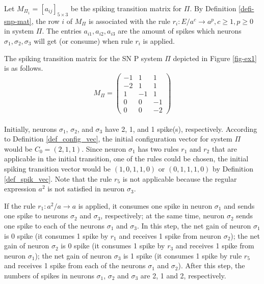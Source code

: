 \documentclass[runningheads]{llncs}
\begin{document}
Let $M_{\Pi_1}=[a_{ij}]_{5 \times 3}$ be the spiking transition
matrix for $\Pi$. By Definition \ref{defi-snp-mat}, the row $i$ of
$M_{\Pi}$ is associated with the rule $r_i: E/a^c\rightarrow a^p,
c\geq 1,p\geq 0$ in system $\Pi$. The entries $a_{i1},a_{i2},a_{i3}$
are the amount of spikes which neurons $\sigma_1,\sigma_2,\sigma_3$
will get (or consume) when rule $r_i$ is applied.


The spiking transition matrix for the SN P system $\Pi$ depicted
 in Figure \ref{fig-ex1} is as follows.\\
[2mm]
\begin{equation}\label{snp_mat}
M_{\Pi} = \left( \begin{array}{ccc}
  -1 & 1 & 1\\
  -2 & 1 &  1 \\
   1 &  -1 & 1 \\
   0 & 0 & -1\\
   0 & 0& -2
  \end{array}\right)
\end{equation}
\\
[0.5mm]


 Initially, neurons $\sigma_1$, $\sigma_2$, and $\sigma_3$ have
  2, 1, and 1 spike(s), respectively. According to Definition \ref{def_config_vec},
  the initial configuration vector
 for system $\Pi$ would be $C_{0} = (2,1,1)$.
 Since neuron $\sigma_1$ has two rules
 $r_{1}$ and $r_{2}$ that are applicable in the
 initial transition, one of the rules could be chosen, the initial
 spiking transition vector would be $(1,0,1,1,0)$ or $(0,1,1,1,0)$ by Definition \ref{def_spik_vec}.
  Note that the rule $r_{5}$ is not applicable because the regular expression
 $a^{2}$ is not satisfied in neuron $\sigma_3$.

If the rule $r_1:a^2/a\rightarrow a$ is applied, it consumes one
spike in neuron $\sigma_1$ and sends one spike to neurons $\sigma_2$
and $\sigma_3$, respectively; at the same time, neuron $\sigma_2$
sends one spike to each of the neurons $\sigma_1$ and $\sigma_3$. In
this step, the net gain of neuron $\sigma_1$ is 0 spike (it consumes
1 spike by $r_1$ and receives 1 spike from neuron $\sigma_2$); the
net gain of neuron $\sigma_2$ is 0 spike (it consumes 1 spike by
$r_3$ and receives 1 spike from neuron $\sigma_1$); the net gain of
neuron $\sigma_3$ is 1 spike (it consumes 1 spike by rule $r_5$ and
receives 1 spike from each of the neurons $\sigma_1$ and
$\sigma_2$). After this step, the numbers of spikes in neurons
$\sigma_1$, $ \sigma_2$ and $\sigma_3$ are 2, 1 and 2, respectively.
\end{document}
